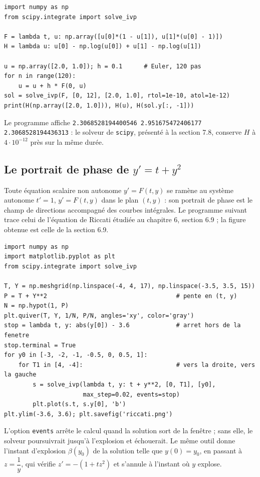 \documentclass[a4paper,twoside]{report}
\begin{document}
\begin{lstlisting}
import numpy as np
from scipy.integrate import solve_ivp

F = lambda t, u: np.array([u[0]*(1 - u[1]), u[1]*(u[0] - 1)])
H = lambda u: u[0] - np.log(u[0]) + u[1] - np.log(u[1])

u = np.array([2.0, 1.0]); h = 0.1      # Euler, 120 pas
for n in range(120):
    u = u + h * F(0, u)
sol = solve_ivp(F, [0, 12], [2.0, 1.0], rtol=1e-10, atol=1e-12)
print(H(np.array([2.0, 1.0])), H(u), H(sol.y[:, -1]))
\end{lstlisting}

\noindent Le programme affiche \texttt{2.3068528194400546 2.951675472406177 2.3068528194436313} : le solveur de \texttt{scipy}, présenté à la section 7.8, conserve $H$ à $4 \cdot 10^{-12}$ près sur la même durée.

\subsection{Le portrait de phase de \texorpdfstring{$y' = t + y^{2}$}{y' = t + y\^{}2}}

Toute équation scalaire non autonome $y' = F(t, y)$ se ramène au système autonome $t' = 1$, $y' = F(t, y)$ dans le plan $(t, y)$ : son portrait de phase est le champ de directions accompagné des courbes intégrales. Le programme suivant trace celui de l'équation de Riccati étudiée au chapitre 6, section 6.9 ; la figure obtenue est celle de la section 6.9.

\begin{lstlisting}
import numpy as np
import matplotlib.pyplot as plt
from scipy.integrate import solve_ivp

T, Y = np.meshgrid(np.linspace(-4, 4, 17), np.linspace(-3.5, 3.5, 15))
P = T + Y**2                                    # pente en (t, y)
N = np.hypot(1, P)
plt.quiver(T, Y, 1/N, P/N, angles='xy', color='gray')
stop = lambda t, y: abs(y[0]) - 3.6             # arret hors de la fenetre
stop.terminal = True
for y0 in [-3, -2, -1, -0.5, 0, 0.5, 1]:
    for T1 in [4, -4]:                          # vers la droite, vers la gauche
        s = solve_ivp(lambda t, y: t + y**2, [0, T1], [y0],
                      max_step=0.02, events=stop)
        plt.plot(s.t, s.y[0], 'b')
plt.ylim(-3.6, 3.6); plt.savefig('riccati.png')
\end{lstlisting}

\noindent L'option \texttt{events} arrête le calcul quand la solution sort de la fenêtre ; sans elle, le solveur poursuivrait jusqu'à l'explosion et échouerait. Le même outil donne l'instant d'explosion $\beta(y_{0})$ de la solution telle que $y(0) = y_{0}$, en passant à $z = \dfrac{1}{y}$, qui vérifie $z' = -(1 + tz^{2})$ et s'annule à l'instant où $y$ explose.
\end{document}
